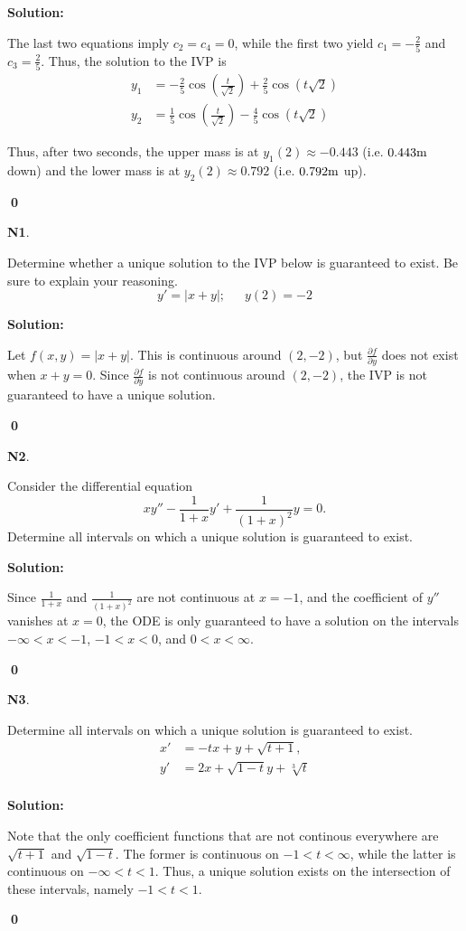\documentclass{article}
\newenvironment{problem}[1]
{
  \begin{flushleft}
  \textbf{#1}.
  \ignorespaces
}
{
  \end{flushleft}
}
\newenvironment{solution}
{
  \ignorespaces
  \textbf{Solution:}
}
{
  \ignorespacesafterend
  \begin{flushright}
  {\bfseries \qed}
  \end{flushright}
}
\begin{document}
\begin{solution}
The last two equations imply \(c_2=c_4=0\), while the first two yield \(c_1=-\frac{2}{5}\) and \(c_3 = \frac{2}{5}\).  Thus, the solution to the IVP is
\begin{align*}
y_1 &= -\frac{2}{5} \cos\left(\frac{t}{\sqrt{2}}\right)+\frac{2}{5}\cos\left(t\sqrt{2}\right) \\
y_2 &= \frac{1}{5} \cos\left(\frac{t}{\sqrt{2}}\right)-\frac{4}{5} \cos\left(t\sqrt{2}\right)
\end{align*}

Thus, after two seconds, the upper mass is at \(y_1(2) \approx -0.443\) (i.e. \(0.443 {\rm m}\) down) and the lower mass is at \(y_2(2) \approx 0.792\) (i.e. \(0.792 {\rm m}\) up).
\end{solution}


\begin{problem}{N1}
Determine whether a unique solution to the IVP below is guaranteed to exist.
Be sure to explain your reasoning.
\[
y' = |x+y|;\,\,\,\,\,\,\,\,\,y(2) = -2
\]
\end{problem}
\begin{solution}
Let \(f(x,y)=|x+y|\).  This is continuous around \((2,-2)\), but \(\frac{\partial f}{\partial y}\) does not exist when \(x+y=0\).  Since \(\frac{\partial f}{\partial y}\) is not continuous around \((2,-2)\), the IVP is not guaranteed to have a unique solution.
\end{solution}

\begin{problem}{N2}
Consider the differential equation
\[
xy'' - \frac{1}{1+x}y' + \frac{1}{(1+x)^2}y = 0.
\]
Determine all intervals on which a unique solution is guaranteed to exist.
\end{problem}
\begin{solution}
Since \(\frac{1}{1+x}\) and \(\frac{1}{(1+x)^2}\) are not continuous at \(x=-1\), and the coefficient of \(y''\) vanishes at \(x=0\), the ODE is only guaranteed to have a solution on the intervals \( -\infty <x<-1\), \(-1<x<0\), and \(0<x<\infty\).  
\end{solution}

\begin{problem}{N3}
Determine all intervals on which a unique solution is guaranteed to exist.
\begin{align*}
x' & = -tx+y + \sqrt{t+1},\\
y' & = 2x + \sqrt{1-t}y + \sqrt[3]{t}\\
\end{align*}
\end{problem}
\begin{solution}
Note that the only coefficient functions that are not continous everywhere are \(\sqrt{t+1}\) and \(\sqrt{1-t}\).  The former is continuous on \( -1<t<\infty\), while the latter is continuous on \(-\infty<t<1\).  Thus, a unique solution exists on the intersection of these intervals, namely \(-1<t<1\).
\end{solution}
\end{document}

